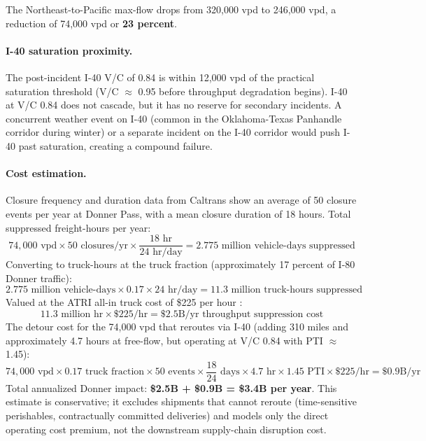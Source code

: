 The Northeast-to-Pacific max-flow drops from 320,000 vpd to 246,000 vpd, a reduction of 74,000 vpd or \textbf{23 percent}.

\paragraph{I-40 saturation proximity.} The post-incident I-40 V/C of 0.84 is within 12,000 vpd of the practical saturation threshold (V/C $\approx$ 0.95 before throughput degradation begins). I-40 at V/C 0.84 does not cascade, but it has no reserve for secondary incidents. A concurrent weather event on I-40 (common in the Oklahoma-Texas Panhandle corridor during winter) or a separate incident on the I-40 corridor would push I-40 past saturation, creating a compound failure.

\paragraph{Cost estimation.} Closure frequency and duration data from Caltrans \citep{ROUTE_C1} show an average of 50 closure events per year at Donner Pass, with a mean closure duration of 18 hours. Total suppressed freight-hours per year:
\begin{equation}
  74{,}000 \text{ vpd} \times 50 \text{ closures/yr} \times \frac{18 \text{ hr}}{24 \text{ hr/day}} = 2.775 \text{ million vehicle-days suppressed}
\end{equation}
Converting to truck-hours at the truck fraction (approximately 17 percent of I-80 Donner traffic):
\begin{equation}
  2.775 \text{ million vehicle-days} \times 0.17 \times 24 \text{ hr/day} = 11.3 \text{ million truck-hours suppressed}
\end{equation}
Valued at the ATRI all-in truck cost of \$225 per hour \citep{ATRI_costs2024}:
\begin{equation}
  11.3 \text{ million hr} \times \$225/\text{hr} = \$2.5\text{B/yr throughput suppression cost}
\end{equation}
The detour cost for the 74,000 vpd that reroutes via I-40 (adding 310 miles and approximately 4.7 hours at free-flow, but operating at V/C 0.84 with PTI $\approx$ 1.45):
\begin{equation}
  74{,}000 \text{ vpd} \times 0.17 \text{ truck fraction} \times 50 \text{ events} \times \frac{18}{24} \text{ days} \times 4.7 \text{ hr} \times 1.45 \text{ PTI} \times \$225/\text{hr} = \$0.9\text{B/yr}
\end{equation}
Total annualized Donner impact: \textbf{\$2.5B + \$0.9B = \$3.4B per year}. This estimate is conservative; it excludes shipments that cannot reroute (time-sensitive perishables, contractually committed deliveries) and models only the direct operating cost premium, not the downstream supply-chain disruption cost.

